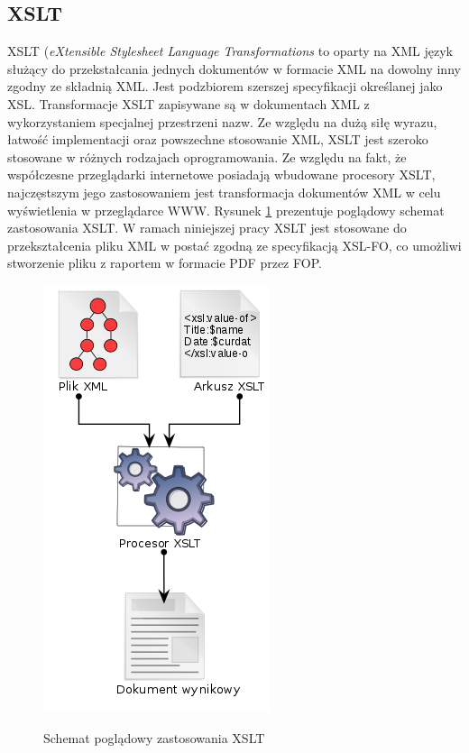 \documentclass[11pt,a4paper]{article}
\begin{document}
\subsection{XSLT} \label{tools:xslt}
XSLT (\emph{eXtensible Stylesheet Language Transformations} to oparty na XML język służący do przekstałcania jednych dokumentów w formacie XML na dowolny inny zgodny ze składnią XML. Jest podzbiorem szerszej specyfikacji określanej jako XSL. Transformacje XSLT zapisywane są w dokumentach XML z wykorzystaniem specjalnej przestrzeni nazw. Ze względu na dużą siłę wyrazu, łatwość implementacji oraz powszechne stosowanie XML, XSLT jest szeroko stosowane w różnych rodzajach oprogramowania. Ze względu na fakt, że współczesne przeglądarki internetowe posiadają wbudowane procesory XSLT, najczęstszym jego zastosowaniem jest transformacja dokumentów XML w celu wyświetlenia w przeglądarce WWW. Rysunek \ref{img:xslt} prezentuje poglądowy schemat zastosowania XSLT. W ramach niniejszej pracy XSLT jest stosowane do przekształcenia pliku XML w postać zgodną ze specyfikacją XSL-FO, co umożliwi stworzenie pliku z raportem w formacie PDF przez FOP.
\begin{figure}[h]
\centering
\caption{Schemat poglądowy zastosowania XSLT}
\includegraphics[scale=0.5]{xslt}
\label{img:xslt}
\end{figure}
\end{document}

